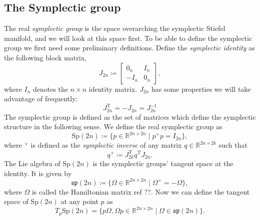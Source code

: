 \subsection{The Symplectic group}
The real \textit{symplectic group} is the space overarching the symplectic Stiefel manifold, and we will look at this space first. To be able to define the symplectic group we first need some preliminary definitions. Define the \textit{symplectic identity} as the following block matrix,
\begin{equation*}
    J_{2n}\coloneqq\begin{bmatrix}
        0_{n} & I_{n} \\
        -I_{n} & 0_{n}
    \end{bmatrix},
\end{equation*}
where $I_{n}$ denotes the $n\times n$ identity matrix. $J_{2n}$ has some properties we will take advantage of frequently:
\begin{equation}\label{eq:J_2n_properties}
    J_{2n} ^{\mathrm{T}}=-J_{2n}=J_{2n}^{-1}
\end{equation}
The symplectic group is defined as the set of matrices which define the symplectic structure in the following sense. We define the real symplectic group as %
\begin{equation}\label{eq:sp_def}
    \mathrm{Sp}(2n)\coloneqq \{p\in \mathbb{R}^{2n\times2n} \;|\; p^{+}p=I_{2n}\},
\end{equation}
where $^{+}$ is defined as the \textit{symplectic inverse} of any matrix $q\in\mathbb{R}^{2n\times2k}$ such that 
\begin{equation}\label{eq:symplectic_inverse}
    q^{+}\coloneqq J_{2k}^{\mathrm{T}}q ^{\mathrm{T}}J_{2n}.
\end{equation}
The Lie algebra of $\mathrm{Sp}(2n)$ is the symplectic groups' tangent space at the identity. It is given by 
\begin{equation}\label{eq:sp_Lie_algebra}
    \mathfrak{sp}(2n)\coloneqq \{\Omega\in \mathbb{R}^{2n\times2n} \;|\; \Omega^{+}=-\Omega\},
\end{equation}
where $\Omega$ is called the Hamiltonian matrix ref ??. 
Now we can define the tangent space of $\mathrm{Sp}(2n)$ at any point $p$  as
\begin{equation}\label{eq:sp_tangent_space}
    T_{p}\mathrm{Sp}(2n)=\{p\Omega,\Omega p\in \mathbb{R}^{2n\times2n} \;|\; \Omega\in\mathfrak{sp}(2n)\}.
\end{equation}


